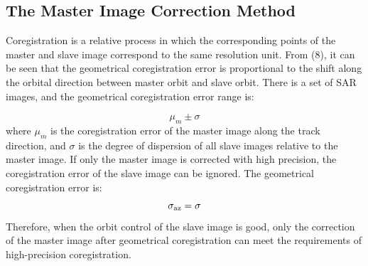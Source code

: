 \documentclass[a4paper,fleqn]{cas-dc}
\begin{document}
\subsection{The Master Image Correction Method}
Coregistration is a relative process in which the corresponding points of the master and slave image correspond to the same resolution unit. From (8), it can be seen that the geometrical coregistration error is proportional to the shift along the orbital direction between master orbit and slave orbit. There is a set of SAR images, and the geometrical coregistration error range is: \par
\begin{equation}
    \mu_m \pm \sigma
\end{equation}
\noindent where $\mu_m$ is the coregistration error of the master image along the track direction, and $\sigma$ is the degree of dispersion of all slave images relative to the master image. If only the master image is corrected with high precision, the coregistration error of the slave image can be ignored. The geometrical coregistration error is:
\begin{equation}
    \sigma_{\rm az} = \sigma
\end{equation}
\noindent Therefore, when the orbit control of the slave image is good, only the correction of the master image after geometrical coregistration can meet the requirements of high-precision coregistration. \par
\end{document}

